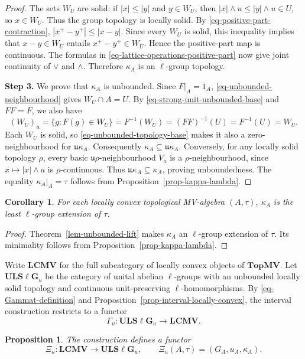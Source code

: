 \documentclass[preprint,3p]{elsarticle}
\theoremstyle{plain}
\newtheorem{prop}[thm]{Proposition}
\newtheorem{cor}[thm]{Corollary}
\theoremstyle{definition}
\newcommand{\TopMV}{\mathbf{TopMV}}
\newcommand{\LCMV}{\mathbf{LCMV}}
\newcommand{\ULS}{\mathbf{ULS\ell G}_{u}}
\numberwithin{equation}{section}
\begin{document}
\begin{proof}
The sets $W_U$ are solid: if $|x|\leq|y|$ and $y\in W_U$, then
$|x|\wedge u\leq|y|\wedge u\in U$, so $x\in W_U$.
Thus the group topology is locally solid.
By \eqref{eq-positive-part-contraction}, $|x^+-y^+|\leq|x-y|$.
Since every $W_U$ is solid, this inequality implies that
$x-y\in W_U$ entails $x^+-y^+\in W_U$.
Hence the positive-part map is continuous. The formulas in
\eqref{eq-lattice-operations-positive-part} now give joint continuity
of $\vee$ and $\wedge$.  Therefore $\kappa_A$ is an $\ell$-group topology.

\textbf{Step 3.} We prove that $\kappa_A$ is unbounded.
Since $F|_A=1_A$, \eqref{eq-unbounded-neighbourhood} gives
$W_U\cap A=U$.  By \eqref{eq-strong-unit-unbounded-base}
and $FF=F$, we also have
\[
 (W_U)_u=\{g:F(g)\in W_U\}=F^{-1}(W_U)=(FF)^{-1}(U)=F^{-1}(U)=W_U.
\]
Each $W_U$ is solid, so \eqref{eq-unbounded-topology-base} makes it
also a zero-neighbourhood for $\mathfrak u\kappa_A$.
Consequently $\kappa_A\subseteq\mathfrak u\kappa_A$.
Conversely, for any locally solid topology $\rho$, every basic
$\mathfrak u\rho$-neighbourhood $V_a$ is a $\rho$-neighbourhood,
since $x\mapsto |x|\wedge a$ is $\rho$-continuous.
Thus $\mathfrak u\kappa_A\subseteq\kappa_A$, proving unboundedness.
The equality $\kappa_A|_A=\tau$ follows from
Proposition~\ref{prop-kappa-lambda}.
\end{proof}

\begin{cor}
\label{cor-extremal-lgroup-extensions}
For each locally convex topological MV-algebra $(A,\tau)$,
$\kappa_A$ is the least $\ell$-group extension of $\tau$.
\end{cor}

\begin{proof}
Theorem~\ref{lem-unbounded-lift} makes $\kappa_A$ an $\ell$-group
extension of $\tau$.  Its minimality follows from
Proposition~\ref{prop-kappa-lambda}.
\end{proof}

Write $\LCMV$ for the full subcategory of locally convex objects of
$\TopMV$.  Let $\ULS$ be the category of unital abelian $\ell$-groups
with an unbounded locally solid topology and continuous unit-preserving
$\ell$-homomorphisms.  By \eqref{eq-Gammat-definition} and
Proposition~\ref{prop-interval-locally-convex}, the interval construction
restricts to a functor
\[
 \Gamma_u\colon\ULS\longrightarrow\LCMV.
\]

\begin{prop}
\label{prop-Xiu-functor}
The construction defines a functor
\[
 \Xi_u\colon\LCMV\longrightarrow\ULS,
 \qquad
 \Xi_u(A,\tau)=(G_A,u_A,\kappa_A).
\]
\end{prop}
\end{document}

